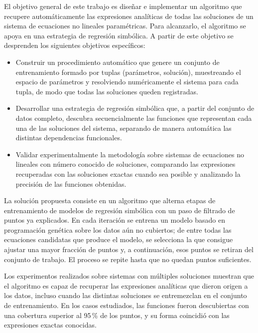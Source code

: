 \documentclass{article} \usepackage[utf8]{inputenc} \usepackage[spanish]{babel} \usepackage{amsmath, amssymb, amsthm} \usepackage{bm} \usepackage{float} \usepackage{longtable} \usepackage[hidelinks]{hyperref}
\begin{document}
El objetivo general de este trabajo es diseñar e implementar un algoritmo que recupere automáticamente las expresiones analíticas de todas las soluciones de un sistema de ecuaciones no lineales paramétricas.  Para alcanzarlo, el algoritmo se apoya en una estrategia de regresión simbólica.  A partir de este objetivo se desprenden los siguientes objetivos específicos:

\begin{itemize} \item Construir un procedimiento automático que genere un conjunto de entrenamiento formado por tuplas (parámetros, solución), muestreando el espacio de parámetros y resolviendo numéricamente el sistema para cada tupla, de modo que todas las soluciones queden registradas.

\item Desarrollar una estrategia de regresión simbólica que, a partir del conjunto de datos completo, descubra secuencialmente las funciones que representan cada una de las soluciones del sistema, separando de manera automática las distintas dependencias funcionales.

\item Validar experimentalmente la metodología sobre sistemas de ecuaciones no lineales con número conocido de soluciones, comparando las expresiones recuperadas con las soluciones exactas cuando sea posible y analizando la precisión de las funciones obtenidas. \end{itemize}

La solución propuesta consiste en un algoritmo que alterna etapas de entrenamiento de modelos de regresión simbólica con un paso de filtrado de puntos ya explicados.  En cada iteración se entrena un modelo basado en programación genética sobre los datos aún no cubiertos; de entre todas las ecuaciones candidatas que produce el modelo, se selecciona la que consigue ajustar una mayor fracción de puntos y, a continuación, esos puntos se retiran del conjunto de trabajo.  El proceso se repite hasta que no quedan puntos suficientes.

Los experimentos realizados sobre sistemas con múltiples soluciones muestran que el algoritmo es capaz de recuperar las expresiones analíticas que dieron origen a los datos, incluso cuando las distintas soluciones se entremezclan en el conjunto de entrenamiento.  En los casos estudiados, las funciones fueron descubiertas con una cobertura superior al 95\,\% de los puntos, y su forma coincidió con las expresiones exactas conocidas.
\end{document}
